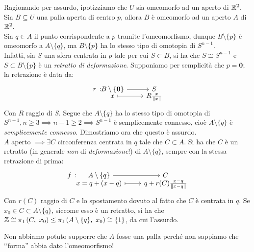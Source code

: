 \begin{demonstration}
	Ragionando per assurdo, ipotizziamo che $U$ sia omeomorfo ad un aperto di $\mathbb{R}^2$. Sia $B\subseteq U$ una palla aperta di centro $p$, allora $B$ è omeomorfo ad un aperto $A$ di $\mathbb{R}^2$.\\
	Sia $q\in A$ il punto corrispondente a $p$ tramite l'omeomorfismo, dunque $B\setminus\{p\}$ è omeomorfo a $A\setminus\{q\}$, ma $B\setminus\{p\}$ ha lo stesso tipo di omotopia di $S^{n-1}$.\\
	Infatti, sia $S$ una sfera centrata in $p$ tale per cui $S\subset B$, si ha che $S\cong S^{n-1}$ e $S\subset B\setminus\{p\}$ è un \textit{retratto di deformazione}. Supponiamo per semplicità che $p=\mathbf{0}$; la retrazione è data da:
	\begin{equation*}
		\funztot r {B\setminus \{\mathbf{0}\}} S x {R\frac{x}{\| x \|}}
	\end{equation*}
	Con $R$ raggio di $S$. Segue che $A\setminus \{q\}$ ha lo stesso tipo di omotopia di $S^{n-1}, n\geq 3\implies n-1\geq 2\implies S^{n-1}$ è semplicemente connesso, cioè $A\setminus\{q\}$ è \textit{semplicemente connesso}. Dimostriamo ora che questo è assurdo.\\
	$A$ aperto $\implies \exists C$ circonferenza centrata in $q$ tale che $C\subset A$. Si ha che $C$ è un retratto (in generale \textit{non} di \textit{deformazione}!) di $A\setminus\{q\}$, sempre con la stessa retrazione di prima:
	\begin{equation*}
		\funztot f {A\setminus\{q\}} C {x=q+(x-q)} {q+r(C)\frac{x-q}{\| x-q \|}}
	\end{equation*}
	Con $r(C)$ raggio di $C$ e lo spostamento dovuto al fatto che $C$ è centrata in $q$. Se $x_0\in C\subset A\setminus\{q\}$, siccome esso è un retratto,  si ha che $\integerset\cong \gruf{C}{x_0}\leq\gruf{A\setminus\{q\}}{x_0}\cong\left\{1\right\}$, da cui l'assurdo.
\end{demonstration}
\begin{attention}
	Non abbiamo potuto supporre che $A$ fosse una palla perché non sappiamo che ‘‘forma'' abbia dato l'omeomorfismo!
\end{attention}
